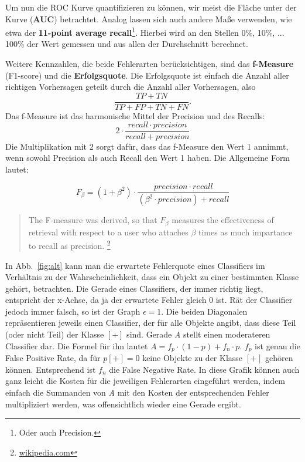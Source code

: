 Um nun die ROC Kurve quantifizieren zu können, wir meist die Fläche unter der
Kurve (\textbf{AUC}) betrachtet. Analog lassen sich auch andere Maße verwenden,
wie etwa der \textbf{11-point average recall}\footnote{Oder auch Precision.}.
Hierbei wird an den Stellen 0\%, 10\%, ... 100\% der Wert gemessen und aus allen
der Durchschnitt berechnet.

Weitere Kennzahlen, die beide Fehlerarten berücksichtigen, sind das 
\textbf{f-Measure} (F1-score) und die \textbf{Erfolgsquote}. Die 
Erfolgsquote ist einfach die Anzahl aller richtigen Vorhersagen geteilt durch die
Anzahl aller Vorhersagen, also
\[
	\frac{TP+TN}{TP+FP+TN+FN}.
\]
Das f-Measure ist das harmonische Mittel der Precision und des Recalls:
\[
	2 \cdot \frac{recall \cdot precision}{recall + precision}
\]
Die Multiplikation mit 2 sorgt dafür, dass das f-Measure den Wert 1 annimmt,
wenn sowohl Precision als auch Recall den Wert 1 haben. Die Allgemeine Form
lautet:

\[
	F_\beta = (1 + \beta ^2) \cdot \frac{precision \cdot recall}{(\beta^2 \cdot precision) + recall}
\]

\begin{quote}
	\glqq The F-measure was derived, so that \(F_\beta\) 
	measures the effectiveness of retrieval
	with respect to a user who attaches \(\beta\) times as much impartance to recall as 
	precision.\grqq
	\footnote{\href{https://en.wikipedia.org/wiki/F1_score}{wikipedia.com}}
\end{quote}



In Abb.~\ref{fig:alt} kann man die erwartete Fehlerquote eines Classifiers im
Verhältnis zu der Wahrscheinlichkeit, dass ein Objekt zu einer bestimmten Klasse
gehört, betrachten. Die Gerade eines Classifiers, der immer richtig liegt, entspricht
der x-Achse, da ja der erwartete Fehler gleich 0 ist. Rät der Classifier jedoch immer
falsch, so ist der Graph \(\epsilon = 1\). Die beiden Diagonalen repräsentieren 
jeweils einen Classifier, der für alle Objekte angibt, dass diese Teil (oder nicht Teil)
der Klasse \([+]\) sind. Gerade \textit{A} stellt einen moderateren Classifier dar. 
Die Formel für ihn lautet \(A = f_p \cdot (1-p) + f_n \cdot p\). \(f_p\) ist genau die 
False Positive Rate, da für \(p[+]=0\) keine Objekte zu der Klasse \([+]\) gehören
können. Entsprechend ist \(f_n\) die False Negative Rate. In diese Grafik können
auch ganz leicht die Kosten für die jeweiligen Fehlerarten eingeführt werden,
indem einfach die Summanden von \textit{A} mit den Kosten der entsprechenden Fehler
multipliziert werden, was offensichtlich wieder eine Gerade ergibt.

